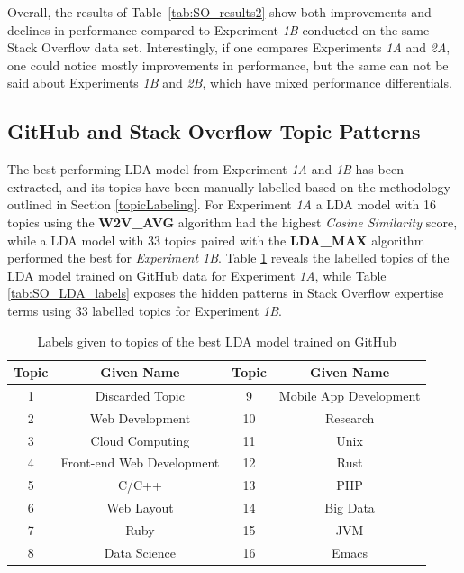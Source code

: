             Overall, the results of Table~\ref{tab:SO_results2} show both improvements and declines in performance compared to Experiment \emph{1B} conducted on the same Stack Overflow data set. Interestingly, if one compares Experiments \emph{1A} and \emph{2A}, one could notice mostly improvements in performance, but the same can not be said about Experiments \emph{1B} and \emph{2B}, which have mixed performance differentials. 
            
        \subsection{GitHub and Stack Overflow Topic Patterns\label{topic_patterns}}
        
            The best performing LDA model from Experiment \emph{1A} and \emph{1B} has been extracted, and its topics have been manually labelled based on the methodology outlined in Section \ref{topicLabeling}. For Experiment \emph{1A} a LDA model with 16 topics using the \textbf{W2V\_AVG} algorithm had the highest \emph{Cosine Similarity} score, while a LDA model with 33 topics paired with the \textbf{LDA\_MAX} algorithm performed the best for \emph{Experiment 1B}. Table \ref{tab:GH_LDA_labels} reveals the labelled topics of the LDA model trained on GitHub data for Experiment \emph{1A}, while Table \ref{tab:SO_LDA_labels} exposes the hidden patterns in Stack Overflow expertise terms using 33 labelled topics for Experiment \emph{1B}.
     
            \begin{table}
              \centering
              \caption{Labels given to topics of the best LDA model trained on GitHub}\label{tab:GH_LDA_labels}
                \vspace{6pt} %
              \begin{tabular}{|c c|c c|}
                \hline
                Topic & Given Name & Topic & Given Name \\
                \hline
                1 & Discarded Topic & 9 & Mobile App Development \\
                2 & Web Development & 10 & Research \\
                3 & Cloud Computing & 11 & Unix \\
                4 & Front-end Web Development & 12 & Rust \\
                5 & C/C++ & 13 & PHP \\
                6 & Web Layout & 14 & Big Data \\
                7 & Ruby & 15 & JVM \\
                8 & Data Science & 16 & Emacs \\
                \hline
              \end{tabular}%
            \end{table}
            
